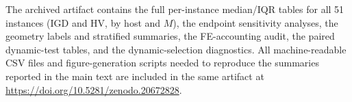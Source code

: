 \documentclass[runningheads]{llncs}
\begin{document}
\FloatBarrier

The archived artifact contains the full per-instance median/IQR tables for all 51 instances (IGD and HV, by host and $M$), the endpoint sensitivity analyses, the geometry labels and stratified summaries, the FE-accounting audit, the paired dynamic-test tables, and the dynamic-selection diagnostics. All machine-readable CSV files and figure-generation scripts needed to reproduce the summaries reported in the main text are included in the same artifact at \url{https://doi.org/10.5281/zenodo.20672828}.



\end{document}
